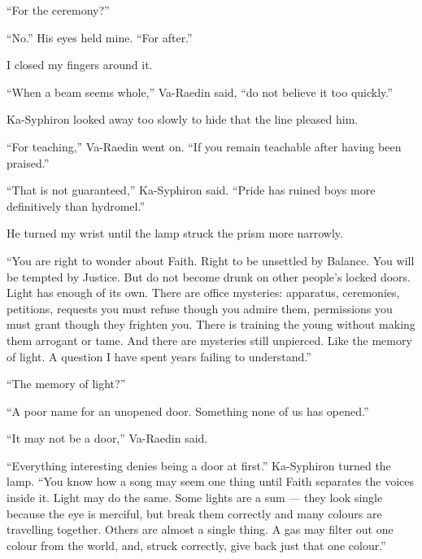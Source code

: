 ``For the ceremony?''\par

``No.'' His eyes held mine. ``For after.''\par

I closed my fingers around it.\par

``When a beam seems whole,'' Va-Raedin said, ``do not believe it too quickly.''\par

Ka-Syphiron looked away too slowly to hide that the line pleased him.\par

``For teaching,'' Va-Raedin went on. ``If you remain teachable after having been praised.''\par

``That is not guaranteed,'' Ka-Syphiron said. ``Pride has ruined boys more definitively than hydromel.''\par

He turned my wrist until the lamp struck the prism more narrowly.\par

``You are right to wonder about Faith. Right to be unsettled by Balance. You will be tempted by Justice. But do not become drunk on other people's locked doors. Light has enough of its own.
There are office mysteries: apparatus, ceremonies, petitions, requests you must refuse though you admire them, permissions you must grant though they frighten you. There is training the young without making them arrogant or tame.
And there are mysteries still unpierced. Like the memory of light. A question I have spent years failing to understand.''\par

``The memory of light?''\par

``A poor name for an unopened door. Something none of us has opened.''\par

``It may not be a door,'' Va-Raedin said.\par

``Everything interesting denies being a door at first.'' Ka-Syphiron turned the lamp.
``You know how a song may seem one thing until Faith separates the voices inside it. Light may do the same. Some lights are a sum --- they look single because the eye is merciful, but break them correctly and many colours are travelling together.
Others are almost a single thing. A gas may filter out one colour from the world, and, struck correctly, give back just that one colour.''\par

